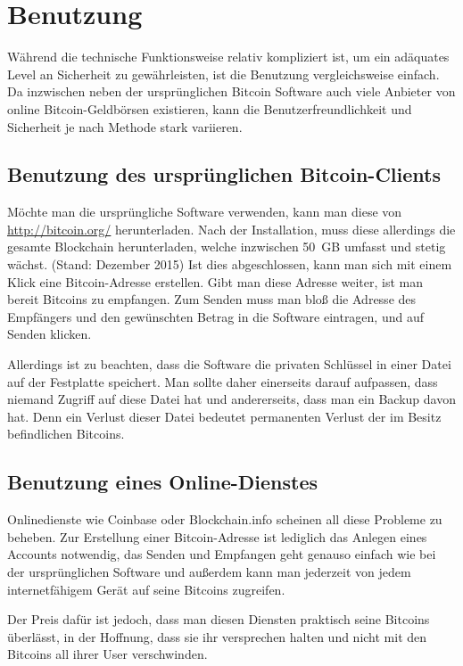 \section{Benutzung}

Während die technische Funktionsweise relativ kompliziert ist, um ein adäquates Level an Sicherheit zu gewährleisten, ist die Benutzung vergleichsweise einfach.
Da inzwischen neben der ursprünglichen Bitcoin Software auch viele Anbieter von online Bitcoin-Geldbörsen existieren, kann die Benutzerfreundlichkeit und Sicherheit je nach Methode stark variieren.

\subsection{Benutzung des ursprünglichen Bitcoin-Clients}

Möchte man die ursprüngliche Software verwenden, kann man diese von \url{http://bitcoin.org/} herunterladen.
Nach der Installation, muss diese allerdings die gesamte Blockchain herunterladen, welche inzwischen 50~GB umfasst und stetig wächst. (Stand: Dezember 2015)
Ist dies abgeschlossen, kann man sich mit einem Klick eine Bitcoin-Adresse erstellen.
Gibt man diese Adresse weiter, ist man bereit Bitcoins zu empfangen.
Zum Senden muss man bloß die Adresse des Empfängers und den gewünschten Betrag in die Software eintragen, und auf Senden klicken.

Allerdings ist zu beachten, dass die Software die privaten Schlüssel in einer Datei auf der Festplatte speichert.
Man sollte daher einerseits darauf aufpassen, dass niemand Zugriff auf diese Datei hat und andererseits, dass man ein Backup davon hat.
Denn ein Verlust dieser Datei bedeutet permanenten Verlust der im Besitz befindlichen Bitcoins.

\subsection{Benutzung eines Online-Dienstes}

Onlinedienste wie Coinbase oder Blockchain.info scheinen all diese Probleme zu beheben.
Zur Erstellung einer Bitcoin-Adresse ist lediglich das Anlegen eines Accounts notwendig, das Senden und Empfangen geht genauso einfach wie bei der ursprünglichen Software und außerdem kann man jederzeit von jedem internetfähigem Gerät auf seine Bitcoins zugreifen.

Der Preis dafür ist jedoch, dass man diesen Diensten praktisch seine Bitcoins überlässt, in der Hoffnung, dass sie ihr versprechen halten und nicht mit den Bitcoins all ihrer User verschwinden.
